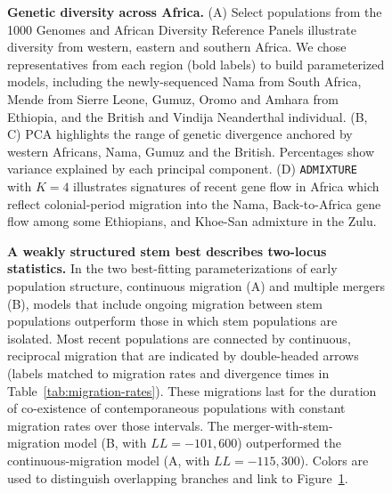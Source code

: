 \documentclass[]{article}
\begin{document}
{\begin{figure}[ht!]
    \centering
    \caption[width=\textwidth]{
        \textbf{Genetic diversity across Africa.}
        (A) Select populations from the 1000 Genomes and African Diversity Reference Panels
        illustrate diversity from western, eastern and southern Africa.
        We chose representatives from each region (bold labels)
        to build parameterized models,
        including the newly-sequenced Nama from South Africa, Mende
        from Sierre Leone, Gumuz, Oromo and Amhara from Ethiopia, and the
        British and Vindija Neanderthal individual.
        (B, C) PCA highlights the range of genetic divergence anchored 
        by western Africans, Nama, Gumuz and the British.
        Percentages show variance explained by each principal component.
        (D) \texttt{ADMIXTURE} with $K=4$ illustrates signatures of recent gene flow in Africa
        which reflect colonial-period migration into the Nama,
        Back-to-Africa gene flow among some Ethiopians, and Khoe-San admixture in the Zulu.
    }
    \label{fig:diversity}
\end{figure}
 
\begin{figure}[t!]
    \centering
    \caption{
        \textbf{A weakly structured stem best describes two-locus statistics.}
        In the two best-fitting parameterizations of early population structure,
        continuous migration (A) and multiple mergers (B), models
        that include ongoing migration between stem populations outperform
        those in which stem populations are isolated. Most recent populations are
        connected by continuous, reciprocal migration that are indicated by 
        double-headed arrows (labels matched to migration rates and divergence
        times in Table~\ref{tab:migration-rates}). These migrations last for the
        duration of co-existence of contemporaneous populations with constant
        migration rates over those intervals. The
        merger-with-stem-migration model (B, with  $LL=-101,600$) outperformed the
        continuous-migration model (A, with $LL=-115,300$).
        Colors are used to distinguish overlapping branches and link to
        Figure~\ref{fig:diversity}.}
    \label{fig:best-fit-models}
\end{figure}

}
\end{document}

